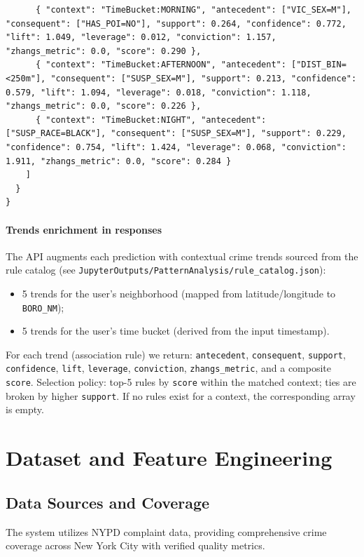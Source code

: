 \documentclass[11pt]{article}
\begin{document}
\begin{verbatim}
      { "context": "TimeBucket:MORNING", "antecedent": ["VIC_SEX=M"], "consequent": ["HAS_POI=NO"], "support": 0.264, "confidence": 0.772, "lift": 1.049, "leverage": 0.012, "conviction": 1.157, "zhangs_metric": 0.0, "score": 0.290 },
      { "context": "TimeBucket:AFTERNOON", "antecedent": ["DIST_BIN=<250m"], "consequent": ["SUSP_SEX=M"], "support": 0.213, "confidence": 0.579, "lift": 1.094, "leverage": 0.018, "conviction": 1.118, "zhangs_metric": 0.0, "score": 0.226 },
      { "context": "TimeBucket:NIGHT", "antecedent": ["SUSP_RACE=BLACK"], "consequent": ["SUSP_SEX=M"], "support": 0.229, "confidence": 0.754, "lift": 1.424, "leverage": 0.068, "conviction": 1.911, "zhangs_metric": 0.0, "score": 0.284 }
    ]
  }
}
\end{verbatim}

\paragraph{Trends enrichment in responses}
The API augments each prediction with contextual crime trends sourced from the rule catalog (see \texttt{JupyterOutputs/PatternAnalysis/rule\_catalog.json}):
\begin{itemize}[leftmargin=*]
\item 5 trends for the user's neighborhood (mapped from latitude/longitude to \texttt{BORO\_NM});
\item 5 trends for the user's time bucket (derived from the input timestamp).
\end{itemize}
For each trend (association rule) we return: \texttt{antecedent}, \texttt{consequent}, \texttt{support}, \texttt{confidence}, \texttt{lift}, \texttt{leverage}, \texttt{conviction}, \texttt{zhangs\_metric}, and a composite \texttt{score}. Selection policy: top-5 rules by \texttt{score} within the matched context; ties are broken by higher \texttt{support}. If no rules exist for a context, the corresponding array is empty.

\section{Dataset and Feature Engineering}

\subsection{Data Sources and Coverage}
The system utilizes NYPD complaint data, providing comprehensive crime coverage across New York City with verified quality metrics.
\end{document}

